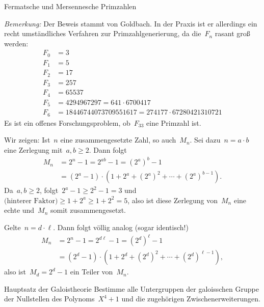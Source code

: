 \documentclass{algblatt}
\begin{document}
\begin{aufgabe}{Fermatsche und Mersennesche Primzahlen}
\begin{loesungE}
\emph{Bemerkung:} Der Beweis stammt von Goldbach. In der Praxis ist er
allerdings ein recht umständliches Verfahren zur Primzahlgenerierung, da
die~$F_n$ rasant groß werden:
\begin{align*}
  F_0 &= 3 \\
  F_1 &= 5 \\
  F_2 &= 17 \\
  F_3 &= 257 \\
  F_4 &= 65537 \\
  F_5 &= 4294967297 = 641 \cdot 6700417 \\
  F_6 &= 18446744073709551617 = 274177 \cdot 67280421310721
\end{align*}
Es ist ein offenes Forschungsproblem, ob~$F_{33}$ eine Primzahl ist.

\item Wir zeigen: Ist~$n$ eine zusammengesetzte Zahl, so auch~$M_n$. Sei
dazu~$n = a \cdot b$ eine Zerlegung mit~$a,b \geq 2$. Dann folgt
\begin{align*}
  M_n &= 2^n - 1 = 2^{ab} - 1 = (2^a)^b - 1 \\
  &= (2^a - 1) \cdot (1 + 2^a + (2^a)^2 + \cdots + (2^a)^{b-1}).
\end{align*}
Da~$a,b \geq 2$, folgt~$2^a - 1 \geq 2^2 - 1 = 3$ und~$\text{(hinterer Faktor)}
\geq 1 + 2^a \geq 1 + 2^2 = 5$, also ist diese Zerlegung von~$M_n$ eine echte
und~$M_n$ somit zusammengesetzt.

\item Gelte~$n = d \cdot \ell$. Dann folgt völlig analog (sogar identisch!)
\begin{align*}
  M_n &= 2^n - 1 = 2^{d\ell} - 1 = (2^d)^\ell - 1 \\
  &= (2^d - 1) \cdot (1 + 2^d + (2^d)^2 + \cdots + (2^d)^{\ell-1}),
\end{align*}
also ist~$M_d = 2^d - 1$ ein Teiler von~$M_n$.
\end{loesungE}
\end{aufgabe}

\begin{aufgabe}{Hauptsatz der Galoistheorie}
Bestimme alle Untergruppen der galoisschen Gruppe der Nullstellen des
Polynoms~$X^4 + 1$ und die zugehörigen Zwischenerweiterungen.
\end{aufgabe}
\end{document}

